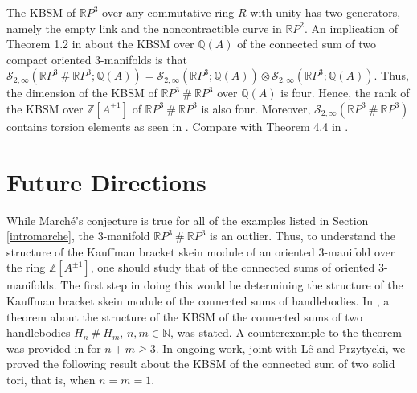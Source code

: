 \documentclass[12pt]{amsproc}
\begin{document}
       The KBSM of $\mathbb RP^3$ over any commutative ring $R$ with unity has two generators, namely the empty link and the noncontractible curve in $\mathbb RP^2$. An implication of Theorem 1.2 in \cite{connsum} about the KBSM over $\mathbb Q(A)$ of the connected sum of two compact oriented $3$-manifolds is that $\mathcal S_{2,\infty}(\mathbb RP^3 \ \# \ \mathbb RP^3; \mathbb Q(A)) = \mathcal S_{2,\infty}(\mathbb RP^3;\mathbb Q(A)) \otimes \mathcal S_{2,\infty}(\mathbb RP^3;\mathbb Q(A))$. Thus, the dimension of the KBSM of $\mathbb RP^3 \ \# \ \mathbb RP^3$ over $\mathbb Q(A)$ is four. Hence, the rank of the KBSM over $\mathbb Z[A^{\pm 1}]$ of $\mathbb RP^3 \ \# \ \mathbb RP^3$ is also four. Moreover, $\mathcal S_{2,\infty}(\mathbb RP^3 \ \# \ \mathbb RP^3)$ contains torsion elements as seen in \cite{rp3rp3}. Compare with Theorem 4.4 in \cite{algtop}.\\
   
    
    \section{Future Directions}
    
    While Marché's conjecture is true for all of the examples listed in Section \ref{intromarche}, the $3$-manifold $\mathbb{R}P^3 \ \# \ \mathbb{R}P^3$ is an outlier. Thus, to understand the structure of the Kauffman bracket skein module of an oriented $3$-manifold over the ring $\mathbb{Z}[A^{\pm 1}]$, one should study that of the connected sums of oriented $3$-manifolds. The first step in doing this would be determining the structure of the Kauffman bracket skein module of the connected sums of handlebodies. In \cite{connsum}, a theorem about the structure of the KBSM of the connected sums of two handlebodies $H
    _n \ \# \ H_m$, $n,m \in \mathbb N$, was stated. A counterexample to the theorem was provided in \cite{counterhandle} for $n+m\geq 3$. In ongoing work, joint with Lê and Przytycki, we proved the following result about the KBSM of the connected sum of two solid tori, that is, when $n=m=1$.
    
\end{document}
